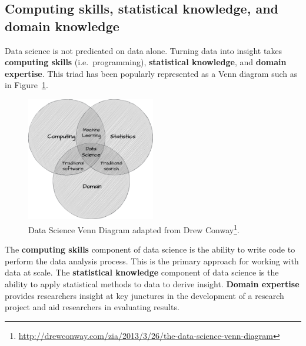 \documentclass[
  letterpaper,
  DIV=11,
  numbers=noendperiod]{scrreport}
\theoremstyle{definition}
\theoremstyle{remark}
\DeclareRobustCommand{\href}[2]{#2\footnote{\url{#1}}}
\begin{document}
\hypertarget{computing-skills-statistical-knowledge-and-domain-knowledge}{%
\subsection{Computing skills, statistical knowledge, and domain
knowledge}\label{computing-skills-statistical-knowledge-and-domain-knowledge}}

Data science is not predicated on data alone. Turning data into insight
takes \textbf{computing skills} (i.e.~programming), \textbf{statistical
knowledge}, and \textbf{domain expertise}. This triad has been popularly
represented as a Venn diagram such as in
Figure~\ref{fig-intro-data-science-venn}.

\begin{figure}[H]

{\centering \includegraphics[width=0.5\textwidth,height=\textheight]{figures/ta-ds-venn.drawio.png}

}

\caption{\label{fig-intro-data-science-venn}Data Science Venn Diagram
adapted from
\href{http://drewconway.com/zia/2013/3/26/the-data-science-venn-diagram}{Drew
Conway}.}

\end{figure}

The \textbf{computing skills} component of data science is the ability
to write code to perform the data analysis process. This is the primary
approach for working with data at scale. The \textbf{statistical
knowledge} component of data science is the ability to apply statistical
methods to data to derive insight. \textbf{Domain expertise} provides
researchers insight at key junctures in the development of a research
project and aid researchers in evaluating results.
\end{document}
